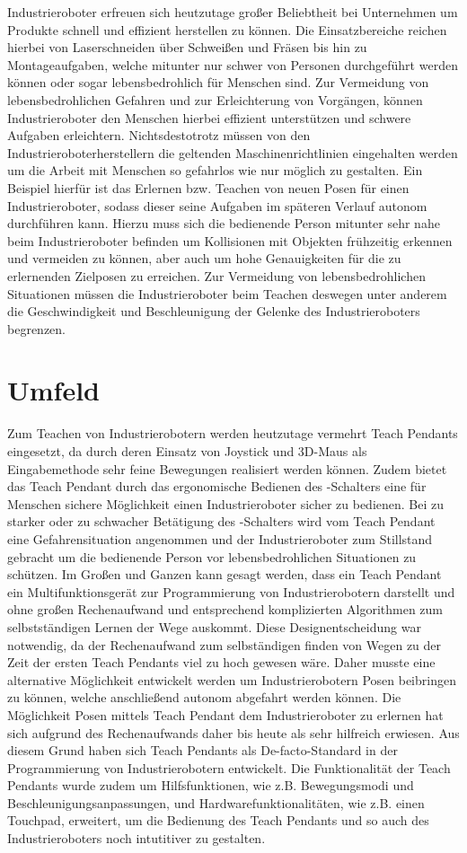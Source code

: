 Industrieroboter erfreuen sich heutzutage großer Beliebtheit bei Unternehmen um Produkte schnell und effizient herstellen zu können. Die Einsatzbereiche reichen hierbei von Laserschneiden über Schweißen und Fräsen bis hin zu Montageaufgaben, welche mitunter nur schwer von Personen durchgeführt werden können oder sogar lebensbedrohlich für Menschen sind. Zur Vermeidung von lebensbedrohlichen Gefahren und zur Erleichterung von Vorgängen, können Industrieroboter den Menschen hierbei effizient unterstützen und schwere Aufgaben erleichtern. Nichtsdestotrotz müssen von den Industrieroboterherstellern die geltenden Maschinenrichtlinien eingehalten werden um die Arbeit mit Menschen so gefahrlos wie nur möglich zu gestalten. Ein Beispiel hierfür ist das Erlernen bzw. Teachen von neuen Posen für einen Industrieroboter, sodass dieser seine Aufgaben im späteren Verlauf autonom durchführen kann. Hierzu muss sich die bedienende Person mitunter sehr nahe beim Industrieroboter befinden um Kollisionen mit Objekten frühzeitig erkennen und vermeiden zu können, aber auch um hohe Genauigkeiten für die zu erlernenden Zielposen zu erreichen. Zur Vermeidung von lebensbedrohlichen Situationen müssen die Industrieroboter beim Teachen deswegen unter anderem die Geschwindigkeit und Beschleunigung der Gelenke des Industrieroboters begrenzen.

\section{Umfeld}
Zum Teachen von Industrierobotern werden heutzutage vermehrt Teach Pendants eingesetzt, da durch deren Einsatz von Joystick und 3D-Maus als Eingabemethode sehr feine Bewegungen realisiert werden können. Zudem bietet das Teach Pendant durch das ergonomische Bedienen des -Schalters eine für Menschen sichere Möglichkeit einen Industrieroboter sicher zu bedienen. Bei zu starker oder zu schwacher Betätigung des -Schalters wird vom Teach Pendant eine Gefahrensituation angenommen und der Industrieroboter zum Stillstand gebracht um die bedienende Person vor lebensbedrohlichen Situationen zu schützen. Im Großen und Ganzen kann gesagt werden, dass ein Teach Pendant ein Multifunktionsgerät zur Programmierung von Industrierobotern darstellt und ohne großen Rechenaufwand und entsprechend komplizierten Algorithmen zum selbstständigen Lernen der Wege auskommt. Diese Designentscheidung war notwendig, da der Rechenaufwand zum selbständigen finden von Wegen zu der Zeit der ersten Teach Pendants viel zu hoch gewesen wäre. Daher musste eine alternative Möglichkeit entwickelt werden um Industrierobotern Posen beibringen zu können, welche anschließend autonom abgefahrt werden können. Die Möglichkeit Posen mittels Teach Pendant dem Industrieroboter zu erlernen hat sich aufgrund des Rechenaufwands daher bis heute als sehr hilfreich erwiesen. Aus diesem Grund haben sich Teach Pendants als De-facto-Standard in der Programmierung von Industrierobotern entwickelt. Die Funktionalität der Teach Pendants wurde zudem um Hilfsfunktionen, wie z.B. Bewegungsmodi und Beschleunigungsanpassungen, und Hardwarefunktionalitäten, wie z.B. einen Touchpad, erweitert, um die Bedienung des Teach Pendants und so auch des Industrieroboters noch intutitiver zu gestalten.


